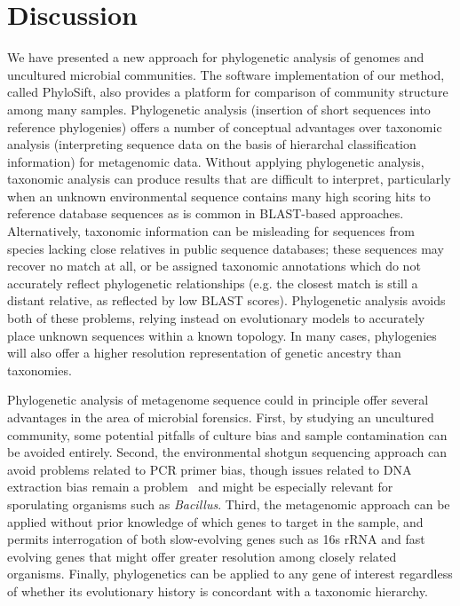 \documentclass[10pt]{article}
\begin{document}
\section*{Discussion}
We have presented a new approach for phylogenetic analysis of genomes and uncultured microbial communities.
The software implementation of our method, called PhyloSift, also provides a platform for comparison of community structure among many samples.
Phylogenetic analysis (insertion of short sequences into reference phylogenies) offers a number of conceptual advantages over taxonomic analysis (interpreting sequence data on the basis of hierarchal classification information) for metagenomic data.
Without applying phylogenetic analysis, taxonomic analysis can produce results that are difficult to interpret, particularly when an unknown environmental sequence contains many high scoring hits to reference database sequences as is common in BLAST-based approaches.
Alternatively, taxonomic information can be misleading for sequences from species lacking close relatives in public sequence databases; these sequences may recover no match at all, or be assigned taxonomic annotations which do not accurately reflect phylogenetic relationships (e.g. the closest match is still a distant relative, as reflected by low BLAST scores).
Phylogenetic analysis avoids both of these problems, relying instead on evolutionary models to accurately place unknown sequences within a known topology.
In many cases, phylogenies will also offer a higher resolution representation of genetic ancestry than taxonomies.


Phylogenetic analysis of metagenome sequence could in principle offer several advantages in the area of microbial forensics.
First, by studying an uncultured community, some potential pitfalls of culture bias and sample contamination can be avoided entirely.
Second, the environmental shotgun sequencing approach can avoid problems related to PCR primer bias, though issues related to DNA extraction bias remain a problem~\cite{Morgan2010} and might be especially relevant for sporulating organisms such as \textit{Bacillus}.
Third, the metagenomic approach can be applied without prior knowledge of which genes to target in the sample, and permits interrogation of both slow-evolving genes such as 16s rRNA and fast evolving genes that might offer greater resolution among closely related organisms.
Finally, phylogenetics can be applied to any gene of interest regardless of whether its evolutionary history is concordant with a taxonomic hierarchy.
\end{document}
